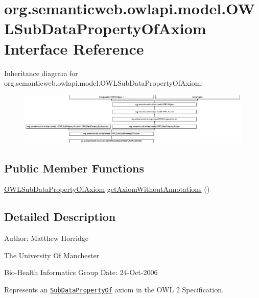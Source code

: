 \hypertarget{interfaceorg_1_1semanticweb_1_1owlapi_1_1model_1_1_o_w_l_sub_data_property_of_axiom}{\section{org.\-semanticweb.\-owlapi.\-model.\-O\-W\-L\-Sub\-Data\-Property\-Of\-Axiom Interface Reference}
\label{interfaceorg_1_1semanticweb_1_1owlapi_1_1model_1_1_o_w_l_sub_data_property_of_axiom}
}
Inheritance diagram for org.\-semanticweb.\-owlapi.\-model.\-O\-W\-L\-Sub\-Data\-Property\-Of\-Axiom\-:\begin{figure}[H]
\begin{center}
\leavevmode
\includegraphics[height=2.484157cm]{interfaceorg_1_1semanticweb_1_1owlapi_1_1model_1_1_o_w_l_sub_data_property_of_axiom}
\end{center}
\end{figure}
\subsection*{Public Member Functions}
\begin{DoxyCompactItemize}
\item 
\hyperlink{interfaceorg_1_1semanticweb_1_1owlapi_1_1model_1_1_o_w_l_sub_data_property_of_axiom}{O\-W\-L\-Sub\-Data\-Property\-Of\-Axiom} \hyperlink{interfaceorg_1_1semanticweb_1_1owlapi_1_1model_1_1_o_w_l_sub_data_property_of_axiom_ae8b4950891c433f6fe86e61416284995}{get\-Axiom\-Without\-Annotations} ()
\end{DoxyCompactItemize}


\subsection{Detailed Description}
Author\-: Matthew Horridge\par
 The University Of Manchester\par
 Bio-\/\-Health Informatics Group Date\-: 24-\/\-Oct-\/2006 

Represents an \href{http://www.w3.org/TR/2009/REC-owl2-syntax-20091027/#Data_Subproperties}{\tt Sub\-Data\-Property\-Of} axiom in the O\-W\-L 2 Specification. 

